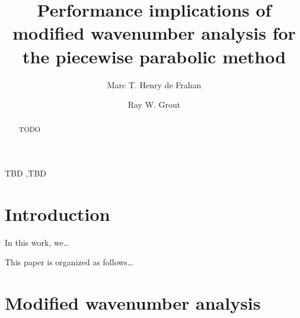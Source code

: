 \documentclass[review]{elsarticle}
\begin{document}
\begin{frontmatter}

\title{Performance implications of modified wavenumber analysis for the piecewise parabolic method}


\author[mymainaddress]{Marc T. Henry de Frahan}

\author[mymainaddress]{Ray W. Grout}

\address[mymainaddress]{High Performance Algorithms and Complex Fluids, Computational Science, National Renewable Energy Laboratory, 15013 Denver W Pkwy, ESIF301, Golden, CO 80401}

\begin{abstract}
TODO
\end{abstract}

\begin{keyword}
TBD \sep TBD
\end{keyword}

\end{frontmatter}

\linenumbers

\section{Introduction}

In this work, we\dots

This paper is organized as follows\dots

\section{Modified wavenumber analysis}\label{sec:}
\end{document}
